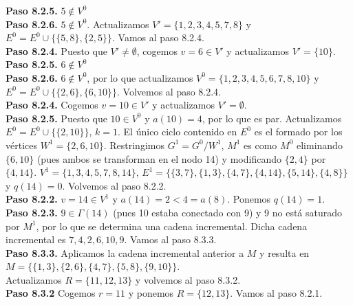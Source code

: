 \documentclass[12pt, oneside, a4paper]{article}
\begin{document}
{{\bf Paso 8.2.5.} $5\not\in V^{0}$\\

{\bf Paso 8.2.6.} $5\not\in V^{0}$. Actualizamos
$V'=\{1,2,3,4,5,7,8\}$ y $E^{0}=E^{0}\cup\{\{5,8\},\{2,5\}\}$. Vamos
al paso 8.2.4.\\

{\bf Paso 8.2.4.} Puesto que $V'\neq\emptyset$, cogemos $v=6\in V'$ y
actualizamos $V'=\{10\}$.\\

{\bf Paso 8.2.5.} $6\not\in V^{0}$\\

{\bf Paso 8.2.6.} $6\not\in V^{0}$, por lo que actualizamos
$V^{0}=\{1,2,3,4,5,6,7,8,10\}$ y
$E^{0}=E^{0}\cup\{\{2,6\},\{6,10\}\}$. Volvemos al paso 8.2.4.\\

{\bf Paso 8.2.4.} Cogemos $v=10\in V'$ y actualizamos $V'=\emptyset$.\\

{\bf Paso 8.2.5.} Puesto que $10\in V^{0}$ y $a(10)=4$, por lo que es
par. Actualizamos $E^{0}=E^{0}\cup\{\{2,10\}\}$, $k=1$. El único ciclo
contenido en $E^{0}$ es el formado por los vértices
$W^{1}=\{2,6,10\}$. Restringimos $G^{1}=G^{0}/W^{1}$, $M^{1}$ es como
$M^{0}$ eliminando $\{6,10\}$ (pues ambos se transforman en el nodo
14) y modificando $\{2,4\}$ por
$\{4,14\}$. $V^{1}=\{1,3,4,5,7,8,14\}$,
$E^{1}=\{\{3,7\},\{1,3\},\{4,7\},\{4,14\},\{5,14\},\{4,8\}\}$  y
$q(14)=0$. Volvemos al paso 8.2.2.\\

{\bf Paso 8.2.2.} $v=14\in V^{1}$ y $a(14)=2<4=a(8)$. Ponemos
$q(14)=1$.\\

{\bf Paso 8.2.3.} $9\in\Gamma(14)$ (pues 10 estaba conectado con 9) y
9 no está saturado por $M^{1}$, por lo que se determina una cadena
incremental. Dicha cadena incremental es $7, 4, 2, 6, 10, 9$. Vamos al
paso 8.3.3.\\

{\bf Paso 8.3.3.} Aplicamos la cadena incremental anterior a $M$ y
resulta en\\

$M = \{\{1,3\},\{2,6\},\{4,7\},\{5,8\},\{9,10\}\}$.\\

Actualizamos $R=\{11,12,13\}$ y volvemos al paso 8.3.2.\\

{\bf Paso 8.3.2} Cogemos $r=11$ y ponemos $R=\{12,13\}$. Vamos al paso
8.2.1.\\

}
\end{document}
